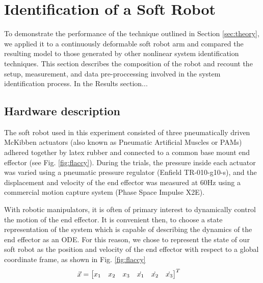 \section{Identification of a Soft Robot}
\label{sec:experiment}

To demonstrate  the performance of the technique outlined in Section \ref{sec:theory}, we applied it to a continuously deformable soft robot arm and compared the resulting model to those generated by other nonlinear system identification techniques.
This section describes the composition of the robot and recount the setup, measurement, and data pre-proccessing involved in the system identification process.
In the Results section... 

\subsection{Hardware description}

The soft robot used in this experiment consisted of three pneumatically driven McKibben actuators (also known as Pneumatic Artificial Muscles or PAMs) adhered together by latex rubber and connected to a common base mount  end effector  (see Fig. \ref{fig:flaccy}).
During the trials, the pressure inside each actuator was varied using a pneumatic pressure regulator (Enfield TR-010-g10-s), and the displacement and velocity of the end effector was measured at $60 \text{Hz}$ using a commercial motion capture system (Phase Space Impulse X2E).

 With robotic manipulators, it is often of primary interest to dynamically control the motion of the end effector.
 It is convenient then, to choose a state representation of the system which is capable of describing the dynamics of the end effector as an ODE.
For this reason, we chose to represent the state of our soft robot as the position and velocity of the end effector with respect to a global coordinate frame, as shown in Fig. \ref{fig:flaccy}
\begin{align}
    \vec{x} &= \begin{bmatrix}  x_1 & x_2 & x_3 & \dot{x_1} & \dot{x_2} & \dot{x_3}  \end{bmatrix}^T
    \label{eq:state}
\end{align}

